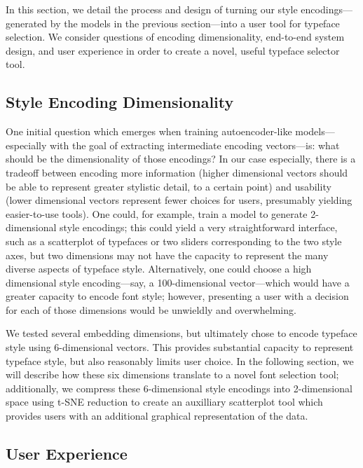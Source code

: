 In this section, we detail the process and design of turning our style encodings—generated by the models in the previous section—into a user tool for typeface selection. We consider questions of encoding dimensionality, end-to-end system design, and user experience in order to create a novel, useful typeface selector tool.

\subsection{Style Encoding Dimensionality}

One initial question which emerges when training autoencoder-like models---especially with the goal of extracting intermediate encoding vectors---is: what should be the dimensionality of those encodings? In our case especially, there is a tradeoff between encoding more information (higher dimensional vectors should be able to represent greater stylistic detail, to a certain point) and usability (lower dimensional vectors represent fewer choices for users, presumably yielding easier-to-use tools). One could, for example, train a model to generate 2-dimensional style encodings; this could yield a very straightforward interface, such as a scatterplot of typefaces or two sliders corresponding to the two style axes, but two dimensions may not have the capacity to represent the many diverse aspects of typeface style. Alternatively, one could choose a high dimensional style encoding—say, a 100-dimensional vector—which would have a greater capacity to encode font style; however, presenting a user with a decision for each of those dimensions would be unwieldly and overwhelming.

We tested several embedding dimensions, but ultimately chose to encode typeface style using 6-dimensional vectors. This provides substantial capacity to represent typeface style, but also reasonably limits user choice. In the following section, we will describe how these six dimensions translate to a novel font selection tool; additionally, we compress these 6-dimensional style encodings into 2-dimensional space using t-SNE reduction to create an auxilliary scatterplot tool which provides users with an additional graphical representation of the data.

\subsection{User Experience}

